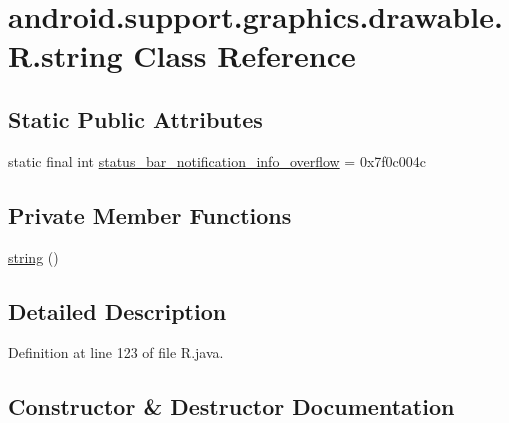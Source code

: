\hypertarget{classandroid_1_1support_1_1graphics_1_1drawable_1_1_r_1_1string}{}\section{android.\+support.\+graphics.\+drawable.\+R.\+string Class Reference}
\label{classandroid_1_1support_1_1graphics_1_1drawable_1_1_r_1_1string}
\subsection*{Static Public Attributes}
\begin{DoxyCompactItemize}
\item 
static final int \mbox{\hyperlink{classandroid_1_1support_1_1graphics_1_1drawable_1_1_r_1_1string_afa1adb5f8eacaefd685b9cfa844e77de}{status\+\_\+bar\+\_\+notification\+\_\+info\+\_\+overflow}} = 0x7f0c004c
\end{DoxyCompactItemize}
\subsection*{Private Member Functions}
\begin{DoxyCompactItemize}
\item 
\mbox{\hyperlink{classandroid_1_1support_1_1graphics_1_1drawable_1_1_r_1_1string_ad7b50a14e3877a7eb2bb415ab99b39b6}{string}} ()
\end{DoxyCompactItemize}


\subsection{Detailed Description}


Definition at line 123 of file R.\+java.



\subsection{Constructor \& Destructor Documentation}
\mbox{\label{classandroid_1_1support_1_1graphics_1_1drawable_1_1_r_1_1string_ad7b50a14e3877a7eb2bb415ab99b39b6}} 
